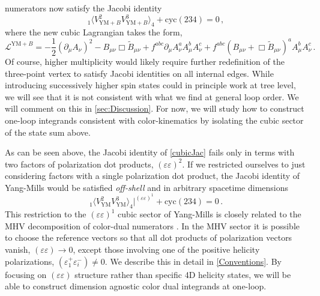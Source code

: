\documentclass[11pt,letter]{article}
\begin{document}
numerators now satisfy the Jacobi identity
\begin{equation}
  {}_1\langle
  V^{2}_{\text{YM}+B}V^{3}_{\text{YM}+B}\rangle_4+\text{cyc}(234) =0\,,
\end{equation}
where the new cubic Lagrangian takes the form,
\begin{equation}
\mathcal{L}^{\text{YM}+B} = -\frac{1}{2}(\partial_\mu A_\nu)^2 -
B_{\mu\nu}\Box\tilde{B}_{\mu\nu}+ f^{abc} \partial_\mu A^a_\nu A^b_\mu
A^c_\nu+ f^{abc} (B_{\mu\nu}+\Box \tilde{B}_{\mu\nu})^a A^b_\mu
A^c_\nu\, .
\end{equation}
Of course, higher multiplicity would likely require further redefinition of
the three-point vertex to satisfy Jacobi identities on all internal
edges. While introducing successively higher spin states could in
principle work at tree level, we will see that it is not consistent
with what we find at general loop order. We will comment on this in
\cref{sec:Discussion}. For
now, we will study how to construct one-loop integrands consistent
with color-kinematics by isolating the cubic sector of the state
sum above.

As can be seen above, the Jacobi identity of \cref{cubicJac} fails
only in terms with two factors of polarization dot products,
$(\varepsilon\varepsilon)^2$. If we restricted ourselves to
just considering factors with a single polarization dot product, the
Jacobi identity of Yang-Mills would be satisfied \textit{off-shell}
and in arbitrary spacetime dimensions
\begin{equation}
{}_1\langle V^{2}_{\text{YM}}V^{3}_{\text{YM}}\rangle_4\big|^{(\varepsilon\varepsilon)^1}+\text{cyc}(234) =0\,.
\end{equation}
This restriction to the $(\varepsilon\varepsilon)^1$ cubic sector of Yang-Mills is closely related to the MHV decomposition of color-dual numerators \cite{TasiLance,ElvangHuangReview,Chen:2019ywi,Chen:2021chy}.
In the MHV sector it is possible to choose the reference vectors so that all dot products of polarization vectors vanish, $(\varepsilon\varepsilon) \rightarrow 0$, except those involving one of the positive helicity polarizations, $(\varepsilon^+_1 \varepsilon^-_i )\neq 0$.
We describe this in detail in \cref{Conventions}.
By focusing on $(\varepsilon\varepsilon)$ structure rather than specific 4D helicity states, we will be able to construct dimension agnostic color dual integrands at one-loop.
\end{document}
